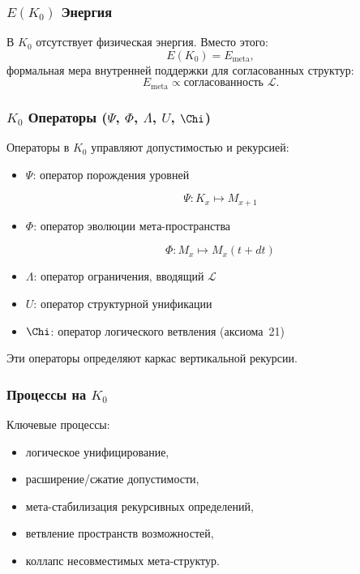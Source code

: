 \subsubsection{\texorpdfstring{$E(K_0)$}{E(K_0)} Энергия}

В $K_0$ отсутствует физическая энергия.
Вместо этого:
\[
E(K_0) = E_{\mathrm{meta}},
\]
формальная мера внутренней поддержки для согласованных структур:
\[
E_{\mathrm{meta}} \propto \text{согласованность }\mathcal{L}.
\]

\subsubsection{\texorpdfstring{$K_0$}{K_0} Операторы (\texorpdfstring{$\Psi$}{\Psi}, \texorpdfstring{$\Phi$}{\Phi}, \texorpdfstring{$\Lambda$}{\Lambda}, \texorpdfstring{$U$}{U}, \texorpdfstring{$\Chi$}{\Chi})}

Операторы в $K_0$ управляют допустимостью и рекурсией:

\begin{itemize}
    \item $\Psi$: оператор порождения уровней

          \[
          \Psi: K_x \mapsto M_{x+1}
          \]
    \item $\Phi$: оператор эволюции мета-пространства

          \[
          \Phi: M_x \mapsto M_x(t+dt)
          \]
    \item $\Lambda$: оператор ограничения, вводящий $\mathcal{L}$
    \item $U$: оператор структурной унификации
    \item $\Chi$: оператор логического ветвления (аксиома~21)
\end{itemize}

Эти операторы определяют каркас вертикальной рекурсии.

\subsubsection{Процессы на \texorpdfstring{$K_0$}{K_0}}

Ключевые процессы:
\begin{itemize}
    \item логическое унифицирование,
    \item расширение/сжатие допустимости,
    \item мета-стабилизация рекурсивных определений,
    \item ветвление пространств возможностей,
    \item коллапс несовместимых мета-структур.
\end{itemize}

